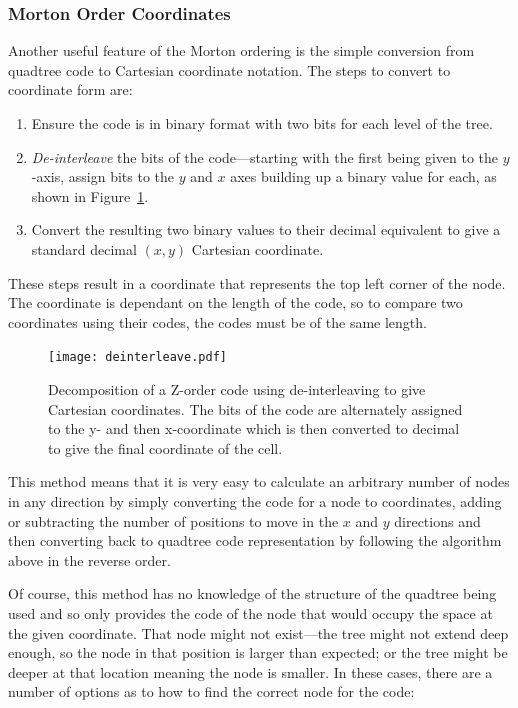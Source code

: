 \subsubsection*{Morton Order Coordinates}
\label{ssub:morton_order_coordinates}

Another useful feature of the Morton ordering is the simple conversion from
quadtree code to Cartesian coordinate notation. The steps to convert to
coordinate form are:

\begin{enumerate}
	\item Ensure the code is in binary format with two bits for each level of
		the tree.
	\item \emph{De-interleave} the bits of the code---starting with the first
		being given to the $y$-axis, assign bits to the $y$ and $x$ axes
		building up a binary value for each, as shown in
		Figure~\ref{fig:deinterleave}.
	\item Convert the resulting two binary values to their decimal equivalent
		to give a standard decimal $(x,y)$ Cartesian coordinate.
\end{enumerate}

These steps result in a coordinate that represents the top left corner of the
node. The coordinate is dependant on the length of the code, so to compare two
coordinates using their codes, the codes must be of the same length.

\begin{figure}[tbh]
	\centering
	\texttt{[image: deinterleave.pdf]}

	\caption[Decomposition of a Z-order code to give coordinates.]
		{Decomposition of a Z-order code using de-interleaving to give
		Cartesian coordinates. The bits of the code are alternately assigned to
		the y- and then x-coordinate which is then converted to decimal to give
		the final coordinate of the cell.}\label{fig:deinterleave}
\end{figure}

This method means that it is very easy to calculate an arbitrary number of
nodes in any direction by simply converting the code for a node to coordinates,
adding or subtracting the number of positions to move in the $x$ and $y$
directions and then converting back to quadtree code representation by
following the algorithm above in the reverse order.

Of course, this method has no knowledge of the structure of the quadtree being
used and so only provides the code of the node that would occupy the space at
the given coordinate. That node might not exist---the tree might not extend
deep enough, so the node in that position is larger than expected; or the tree
might be deeper at that location meaning the node is smaller. In these cases,
there are a number of options as to how to find the correct node for the code:

